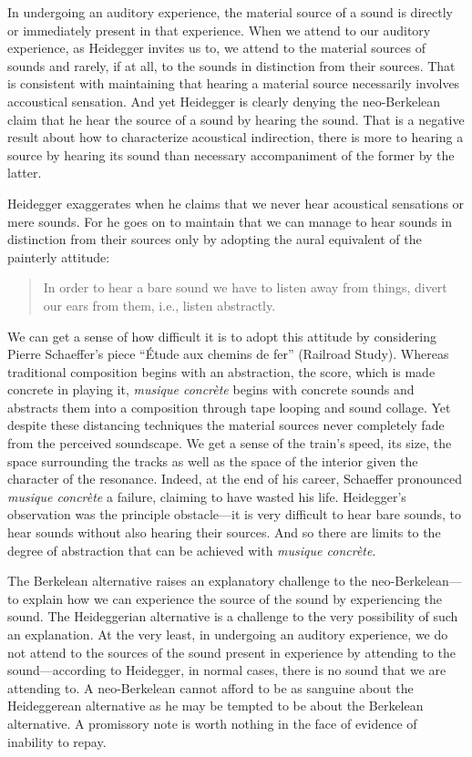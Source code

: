 \documentclass[12pt]{article}
\begin{document}
In undergoing an auditory experience, the material source of a sound is directly or immediately present in that experience. When we attend to our auditory experience, as Heidegger invites us to, we attend to the material sources of sounds and rarely, if at all, to the sounds in distinction from their sources. That is consistent with maintaining that hearing a material source necessarily involves accoustical sensation. And yet Heidegger is clearly denying the neo-Berkelean claim that he hear the source of a sound by hearing the sound. That is a negative result about how to characterize acoustical indirection, there is more to hearing a source by hearing its sound than necessary accompaniment of the former by the latter.

Heidegger exaggerates when he claims that we never hear acoustical sensations or mere sounds. For he goes on to maintain that we can manage to hear sounds in distinction from their sources only by adopting the aural equivalent of the painterly attitude:
\begin{quote}
    In order to hear a bare sound we have to listen away from things, divert our ears from them, i.e., listen abstractly. \citep[152]{Heidegger:1935uq}
\end{quote}
We can get a sense of how difficult it is to adopt this attitude by considering Pierre Schaeffer's piece ``Étude aux chemins de fer'' (Railroad Study). Whereas traditional composition begins with an abstraction, the score, which is made concrete in playing it, \emph{musique concrète} begins with concrete sounds and abstracts them into a composition through tape looping and sound collage. Yet despite these distancing techniques the material sources never completely fade from the perceived soundscape. We get a sense of the train's speed, its size, the space surrounding the tracks as well as the space of the interior given the character of the resonance. Indeed, at the end of his career, Schaeffer pronounced \emph{musique concrète} a failure, claiming to have wasted his life. Heidegger's observation was the principle obstacle---it is very difficult to hear bare sounds, to hear sounds without also hearing their sources. And so there are limits to the degree of abstraction that can be achieved with \emph{musique concrète}.

The Berkelean alternative raises an explanatory challenge to the neo-Berkelean---to explain how we can experience the source of the sound by experiencing the sound. The Heideggerian alternative is a challenge to the very possibility of such an explanation. At the very least, in undergoing an auditory experience, we do not attend to the sources of the sound present in experience by attending to the sound---according to Heidegger, in normal cases, there is no sound that we are attending to. A neo-Berkelean cannot afford to be as sanguine about the Heideggerean alternative as he may be tempted to be about the Berkelean alternative. A promissory note is worth nothing in the face of evidence of inability to repay.
\end{document}
